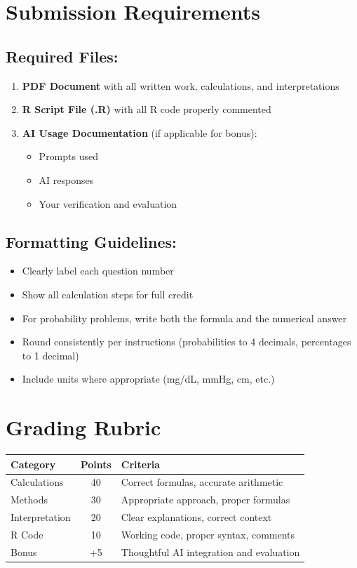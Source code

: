 \documentclass[11pt]{article}
\begin{document}
\vspace{2cm}

\newpage

\section*{Submission Requirements}

\subsection*{Required Files:}
\begin{enumerate}
\item \textbf{PDF Document} with all written work, calculations, and interpretations
\item \textbf{R Script File (.R)} with all R code properly commented
\item \textbf{AI Usage Documentation} (if applicable for bonus):
   \begin{itemize}
   \item Prompts used
   \item AI responses
   \item Your verification and evaluation
   \end{itemize}
\end{enumerate}

\subsection*{Formatting Guidelines:}
\begin{itemize}
\item Clearly label each question number
\item Show all calculation steps for full credit
\item For probability problems, write both the formula and the numerical answer
\item Round consistently per instructions (probabilities to 4 decimals, percentages to 1 decimal)
\item Include units where appropriate (mg/dL, mmHg, cm, etc.)
\end{itemize}

\section*{Grading Rubric}

\begin{table}[h]
\centering
\begin{tabular}{lcp{8cm}}
\toprule
\textbf{Category} & \textbf{Points} & \textbf{Criteria} \\
\midrule
Calculations & 40 & Correct formulas, accurate arithmetic \\
Methods & 30 & Appropriate approach, proper formulas \\
Interpretation & 20 & Clear explanations, correct context \\
R Code & 10 & Working code, proper syntax, comments \\
Bonus & +5 & Thoughtful AI integration and evaluation \\
\bottomrule
\end{tabular}
\end{table}
\end{document}
